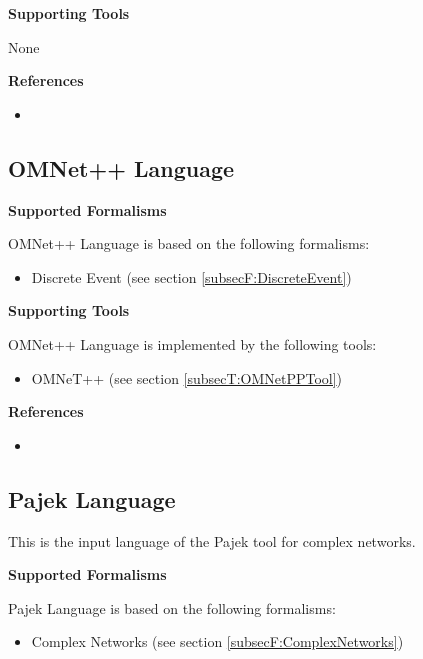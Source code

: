 \textbf{Supporting Tools}

None


\textbf{References}
\begin{itemize}
	
\item {}
\end{itemize}



\subsection{OMNet++ Language}
\label{subsecL:OMNetPPLanguage}



\textbf{Supported Formalisms}

OMNet++ Language is based on the following formalisms:
\begin{itemize}
	\item Discrete Event (see section \ref{subsecF:DiscreteEvent})
\end{itemize}


\textbf{Supporting Tools}

OMNet++ Language is implemented by the following tools:
\begin{itemize}
	\item OMNeT++ (see section \ref{subsecT:OMNetPPTool})
\end{itemize}


\textbf{References}
\begin{itemize}
	
\item {}
\end{itemize}



\subsection{Pajek Language}
\label{subsecL:PajekLanguage}


This is the input language of the Pajek tool for complex networks.

\textbf{Supported Formalisms}

Pajek Language is based on the following formalisms:
\begin{itemize}
	\item Complex Networks (see section \ref{subsecF:ComplexNetworks})
\end{itemize}


